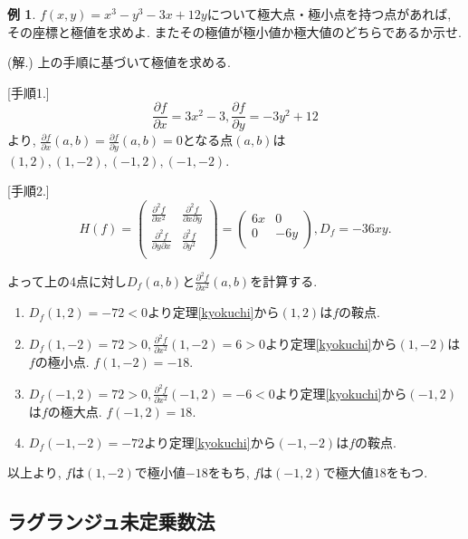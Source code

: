 \documentclass[dvipdfmx,a4paper,11pt]{article}
\theoremstyle{definition}
\newtheorem{exa}[thm]{例}
\newcommand{\pdrv}[2]{\frac{\partial #1}{\partial #2}}
\newcommand{\ppdrv}[3]{\frac{\partial #1}{\partial #2 \partial #3}}
\begin{document}
\begin{exa}
$f(x,y) = x^3 -y^3 -3x +12y$について極大点・極小点を持つ点があれば, その座標と極値を求めよ. またその極値が極小値か極大値のどちらであるか示せ.

(解.) 上の手順に基づいて極値を求める.

[手順1.] 
$$\pdrv{f}{x} = 3x^2 -3, \pdrv{f}{y} = -3y^2 +12$$より, 
$\pdrv{f}{x}(a,b) = \pdrv{f}{y}(a,b) = 0$となる点$(a,b)$は
$(1,2), (1,-2), (-1,2), (-1,-2)$.

[手順2.]
$$H(f) = \left(\begin{array}{cc} \pdrv{^2f}{x^2}& \ppdrv{^2 f}{x}{y}\\ 
\ppdrv{^2 f}{y}{x}& \pdrv{^2f}{y^2}\\ \end{array} \right)
=
\left(\begin{array}{cc} 6x& 0\\ 
0& -6y \\ \end{array} \right), D_f = -36xy.
$$

よって上の4点に対し$D_f(a,b)$と$\pdrv{^2f}{x^2}(a,b) $を計算する.
\begin{enumerate}
  \setlength{\parskip}{0cm} 
  \setlength{\itemsep}{0cm}
\item $D_f(1,2) = -72 <0$より定理\ref{kyokuchi}から$(1,2)$は$f$の鞍点.
\item $D_f(1,-2) = 72 >0, \pdrv{^2f}{x^2}(1,-2) =6 >0$より定理\ref{kyokuchi}から$(1,-2)$は$f$の極小点. $f(1,-2)=-18$.
\item $D_f(-1,2) = 72 >0, \pdrv{^2f}{x^2}(-1,2) =-6 <0$より定理\ref{kyokuchi}から$(-1,2)$は$f$の極大点. $f(-1,2)=18$.
\item $D_f(-1,-2) = -72$より定理\ref{kyokuchi}から$(-1,-2)$は$f$の鞍点.
\end{enumerate}

以上より, $f$は$(1,-2)$で極小値$-18$をもち, $f$は$(-1,2)$で極大値$18$をもつ.
\end{exa}


\subsection{ラグランジュ未定乗数法}
\end{document}
